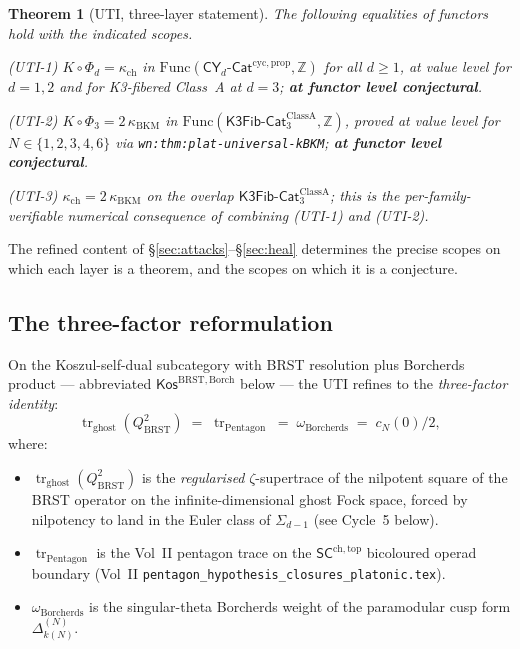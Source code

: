 \documentclass[11pt]{article}
\newtheorem{theorem}{Theorem}
\theoremstyle{definition}
\newcommand{\kch}{\kappa_{\mathrm{ch}}}
\newcommand{\kBKM}{\kappa_{\mathrm{BKM}}}
\newcommand{\BRST}{\mathrm{BRST}}
\newcommand{\tr}{\operatorname{tr}}
\newcommand{\Func}{\mathrm{Func}}
\begin{document}
\begin{theorem}[UTI, three-layer statement]
\label{thm:uti}
The following equalities of functors hold with the indicated scopes.

\textup{(UTI-1)}\quad
$K \circ \Phi_d = \kch$ in $\Func(\mathsf{CY}_d\text{-}\mathsf{Cat}^{\mathrm{cyc},\mathrm{prop}}, \mathbb{Z})$
for all $d \geq 1$, at value level for $d = 1, 2$ and for K3-fibered
Class~A at $d = 3$; \textbf{at functor level conjectural}.

\textup{(UTI-2)}\quad
$K \circ \Phi_3 = 2\,\kBKM$ in
$\Func(\mathsf{K3Fib}\text{-}\mathsf{Cat}_3^{\mathrm{Class A}}, \mathbb{Z})$,
proved at value level for $N \in \{1,2,3,4,6\}$ via
\texttt{wn:thm:plat-universal-kBKM}; \textbf{at functor level conjectural}.

\textup{(UTI-3)}\quad
$\kch = 2\,\kBKM$ on the overlap $\mathsf{K3Fib}\text{-}\mathsf{Cat}_3^{\mathrm{Class A}}$;
this is the per-family-verifiable numerical consequence of combining
\textup{(UTI-1)} and \textup{(UTI-2)}.
\end{theorem}

The refined content of \S\ref{sec:attacks}--\S\ref{sec:heal} determines
the precise scopes on which each layer is a theorem, and the scopes on
which it is a conjecture.

\subsection{The three-factor reformulation}

On the Koszul-self-dual subcategory with BRST resolution plus Borcherds
product --- abbreviated $\mathsf{Kos}^{\BRST,\mathrm{Borch}}$ below ---
the UTI refines to the \emph{three-factor identity}:
\begin{equation}
\label{eq:three-factor}
   \tr_{\mathrm{ghost}}(Q_{\BRST}^2)
   \;=\; \tr_{\mathrm{Pentagon}}
   \;=\; \omega_{\mathrm{Borcherds}}
   \;=\; c_N(0)/2,
\end{equation}
where:
\begin{itemize}
\item $\tr_{\mathrm{ghost}}(Q_{\BRST}^2)$ is the \emph{regularised}
$\zeta$-supertrace of the nilpotent square of the BRST operator on the
infinite-dimensional ghost Fock space, forced by nilpotency to land in
the Euler class of $\Sigma_{d-1}$ (see Cycle~5 below).
\item $\tr_{\mathrm{Pentagon}}$ is the Vol~II pentagon trace on the
$\mathsf{SC}^{\mathrm{ch,top}}$ bicoloured operad boundary
(Vol~II \texttt{pentagon\_hypothesis\_closures\_platonic.tex}).
\item $\omega_{\mathrm{Borcherds}}$ is the singular-theta Borcherds
weight of the paramodular cusp form $\Delta_{k(N)}^{(N)}$.
\end{itemize}
\end{document}
